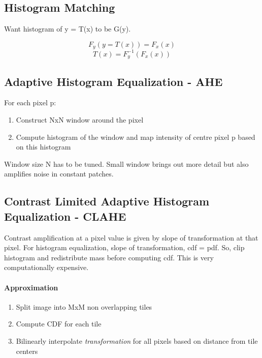 \documentclass[a4paper]{article}
\begin{document}
\subsection{Histogram Matching}
Want histogram of y = T(x) to be G(y).

$$F_y(y = T(x)) = F_x(x)$$
$$T(x) = F_y^{-1}(F_x(x))$$


\subsection{Adaptive Histogram Equalization - AHE}
For each pixel p:
\begin{enumerate}
\item Construct NxN window around the pixel
\item Compute histogram of the window and map intensity of centre pixel p based on this histogram
\end{enumerate}
Window size N has to be tuned. Small window brings out more detail but also amplifies noise in constant patches.

\subsection{Contrast Limited Adaptive Histogram Equalization - CLAHE}
Contrast amplification at a pixel value is given by slope of transformation at that pixel. For histogram equalization, slope of transformation, cdf = pdf. So, clip histogram and redistribute mass before computing cdf.
This is very computationally expensive.
\vspace{-10pt}
\paragraph{Approximation}
\begin{enumerate}
\item Split image into MxM non overlapping tiles
\item Compute CDF for each tile
\item Bilinearly interpolate \textit{transformation} for all pixels based on distance from tile centers
\end{enumerate}
\end{document}
